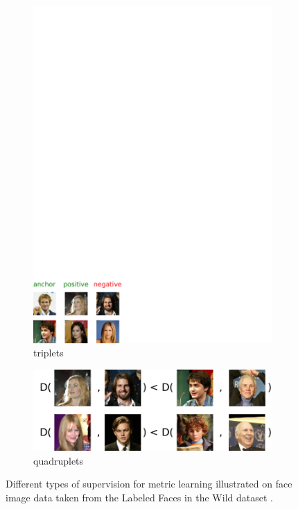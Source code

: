 \documentclass[twoside,11pt]{article}
\begin{document}
\begin{figure}[t]
\begin{subfigure}[t]{0.31\textwidth}
        \centering \includegraphics[scale=0.35]{triplets.pdf}
	\caption{triplets}\label{fig:triplets}
    \end{subfigure}
    \begin{subfigure}[t]{0.31\textwidth}
        \centering \includegraphics[scale=0.35]{quadruplets.pdf}
        \caption{quadruplets}\label{fig:quadruplets}
    \end{subfigure}
    \caption{Different types of supervision for metric learning %
    illustrated on face image data taken from the Labeled Faces in the Wild dataset \citep{Huang12}.}\label{fig:flowers}
\end{figure}
\end{document}
